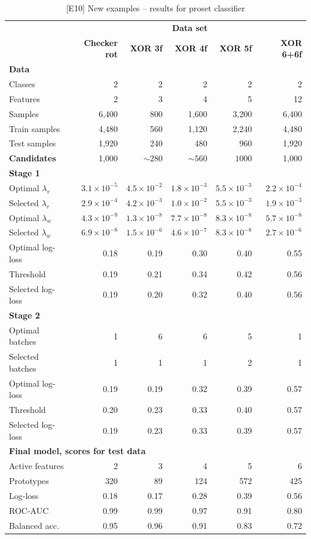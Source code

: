 %
\begin{table}
\caption{[E10] New examples -- results for proset classifier}
\label{tab_e10}
%
\begin{center}
\small
\begin{tabular}{|lrrrrr|}
\hline
&\multicolumn{5}{c|}{\textbf{\hrulefill\ Data set \hrulefill}}\\
&\textbf{Checker rot}&\textbf{XOR 3f}&\textbf{XOR 4f}&\textbf{XOR 5f}&\textbf{XOR 6+6f}\\
\multicolumn{6}{|l|}{\textbf{Data}}\\
Classes&2&2&2&2&2\\
Features&2&3&4&5&12\\
Samples&6,400&800&1,600&3,200&6,400\\
Train samples&4,480&560&1,120&2,240&4,480\\
Test samples&1,920&240&480&960&1,920\\
\textbf{Candidates}&1,000&$\sim280$&$\sim560$&$1000$&1,000\\
\multicolumn{6}{|l|}{\textbf{Stage 1}}\\
Optimal $\lambda_v$&$3.1\times10^{-5}$&$4.5\times10^{-2}$&$1.8\times10^{-3}$&$5.5\times10^{-3}$&$2.2\times10^{-4}$\\
Selected $\lambda_v$&$2.9\times10^{-4}$&$4.2\times10^{-3}$&$1.0\times10^{-2}$&$5.5\times10^{-3}$&$1.9\times10^{-3}$\\
Optimal $\lambda_w$&$4.3\times10^{-9}$&$1.3\times10^{-8}$&$7.7\times10^{-8}$&$8.3\times10^{-8}$&$5.7\times10^{-8}$\\
Selected $\lambda_w$&$6.9\times10^{-8}$&$1.5\times10^{-6}$&$4.6\times10^{-7}$&$8.3\times10^{-8}$&$2.7\times10^{-6}$\\
Optimal log-loss&0.18&0.19&0.30&0.40&0.55\\
Threshold&0.19&0.21&0.34&0.42&0.56\\
Selected log-loss&0.19&0.20&0.32&0.40&0.56\\
\multicolumn{6}{|l|}{\textbf{Stage 2}}\\
Optimal batches&1&6&6&5&1\\
Selected batches&1&1&1&2&1\\
Optimal log-loss&0.19&0.19&0.32&0.39&0.57\\
Threshold&0.20&0.23&0.33&0.40&0.57\\
Selected log-loss&0.19&0.23&0.33&0.39&0.57\\
\multicolumn{6}{|l|}{\textbf{Final model, scores for test data}}\\
Active features&2&3&4&5&6\\
Prototypes&320&89&124&572&425\\
Log-loss&0.18&0.17&0.28&0.39&0.56\\
ROC-AUC&0.99&0.99&0.97&0.91&0.80\\
Balanced acc.&0.95&0.96&0.91&0.83&0.72\\
\hline
\end{tabular}
\end{center}
\end{table}
